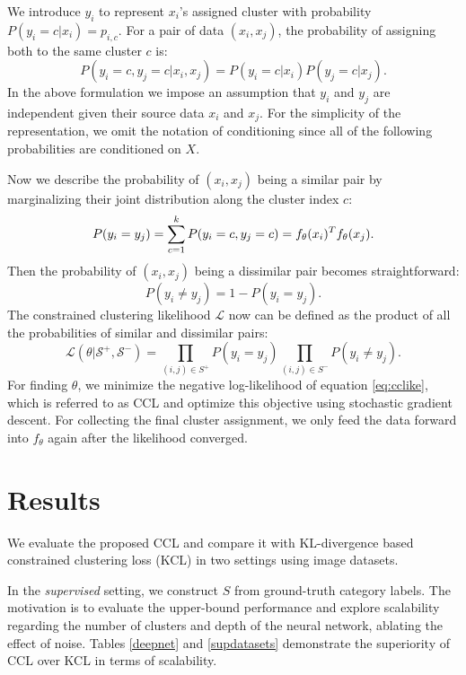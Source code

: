 \documentclass[10pt,twocolumn,letterpaper]{article}
\begin{document}
We introduce $y_i$ to represent $x_i$'s assigned cluster with probability $P(y_i=c|x_i)=p_{i,c}$. For a pair of data $(x_i,x_j)$, the probability of assigning both to the same cluster $c$ is:
\begin{equation*}
P(y_i=c,y_j=c|x_i,x_j)=P(y_i=c|x_i)P(y_j=c|x_j).
\end{equation*}
In the above formulation we impose an assumption that $y_i$ and $y_j$ are independent given their source data $x_i$ and $x_j$. For the simplicity of the representation, we omit the notation of conditioning since all of the following probabilities are conditioned on $X$.

Now we describe the probability of $(x_i,x_j)$ being a similar pair by marginalizing their joint distribution along the cluster index $c$:
\begin{equation} \label{eq:simi}
P(y_i=y_j) = \sum_{c=1}^k{P(y_i=c,y_j=c)} = f_\theta(x_i)^T f_{\theta}(x_j). \\
\end{equation}
Then the probability of $(x_i,x_j)$ being a dissimilar pair becomes straightforward:
\begin{equation} \label{eq:dissimi}
P(y_i \neq y_j) = 1-P(y_i=y_j).
\end{equation}
The constrained clustering likelihood $\mathcal{L}$ now can be defined as the product of all the probabilities of similar and dissimilar pairs:
\begin{equation} \label{eq:cclike}
\mathcal{L(\theta|S^+,S^-)} = \prod_{(i,j) \in S^+}{P(y_i=y_j)}\prod_{(i,j) \in S^-}{P(y_i \neq y_j)}.
\end{equation}
For finding $\theta$, we minimize the negative log-likelihood of equation \eqref{eq:cclike}, which is referred to as CCL and optimize this objective using stochastic gradient descent. For collecting the final cluster assignment, we only feed the data forward into $f_\theta$ again after the likelihood converged.

\section{Results}
We evaluate the proposed CCL and compare it with KL-divergence based constrained clustering loss (KCL) \cite{Hsu16iclrw,Hsu18iclr} in two settings using image datasets.

In the \emph{supervised} setting, we construct $S$ from ground-truth category labels. The motivation is to evaluate the upper-bound performance and explore scalability regarding the number of clusters and depth of the neural network, ablating the effect of noise. Tables \ref{deepnet} and \ref{supdatasets} demonstrate the superiority of CCL over KCL in terms of scalability. 
\end{document}

